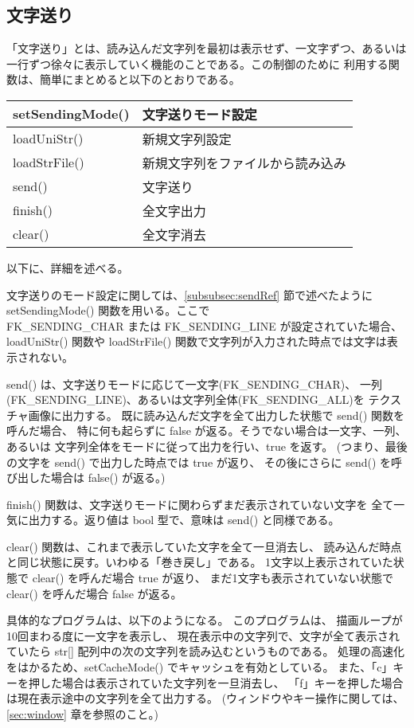 \subsection{文字送り} \label{subsec:textSending}
「文字送り」とは、読み込んだ文字列を最初は表示せず、一文字ずつ、あるいは
一行ずつ徐々に表示していく機能のことである。この制御のために
利用する関数は、簡単にまとめると以下のとおりである。
\begin{center}
\begin{tabular}{|l|l|}
\hline
setSendingMode() & 文字送りモード設定 \\ \hline
loadUniStr() & 新規文字列設定 \\ \hline
loadStrFile() & 新規文字列をファイルから読み込み \\ \hline
send() & 文字送り \\ \hline
finish() & 全文字出力 \\ \hline
clear() & 全文字消去 \\ \hline
\end{tabular}
\end{center}
以下に、詳細を述べる。

文字送りのモード設定に関しては、\ref{subsubsec:sendRef} 節で述べたように
setSendingMode() 関数を用いる。ここで \\
FK\_SENDING\_CHAR または
FK\_SENDING\_LINE が設定されていた場合、loadUniStr() 関数や
loadStrFile() 関数で文字列が入力された時点では文字は表示されない。

send() は、文字送りモードに応じて一文字(FK\_SENDING\_CHAR)、
一列(FK\_SENDING\_LINE)、あるいは文字列全体(FK\_SENDING\_ALL)を
テクスチャ画像に出力する。
既に読み込んだ文字を全て出力した状態で send() 関数を呼んだ場合、
特に何も起らずに false が返る。そうでない場合は一文字、一列、あるいは
文字列全体をモードに従って出力を行い、true を返す。
(つまり、最後の文字を send() で出力した時点では true が返り、
その後にさらに send() を呼び出した場合は false() が返る。)

finish() 関数は、文字送りモードに関わらずまだ表示されていない文字を
全て一気に出力する。返り値は bool 型で、意味は send() と同様である。

clear() 関数は、これまで表示していた文字を全て一旦消去し、
読み込んだ時点と同じ状態に戻す。いわゆる「巻き戻し」である。
1文字以上表示されていた状態で clear() を呼んだ場合 true が返り、
まだ1文字も表示されていない状態で clear() を呼んだ場合 false が返る。

具体的なプログラムは、以下のようになる。
このプログラムは、
描画ループが10回まわる度に一文字を表示し、
現在表示中の文字列で、文字が全て表示されていたら
str[] 配列中の次の文字列を読み込むというものである。
処理の高速化をはかるため、setCacheMode() でキャッシュを有効としている。
また、「c」キーを押した場合は表示されていた文字列を一旦消去し、
「f」キーを押した場合は現在表示途中の文字列を全て出力する。
(ウィンドウやキー操作に関しては、\ref{sec:window} 章を参照のこと。) \\

